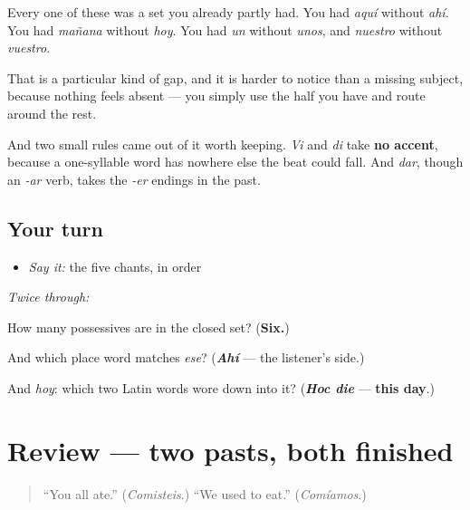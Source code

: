 \begin{grammarlens}[title={Grammar Lens: a gap in a set is hard to see}]
Every one of these was a set you already partly had. You had \emph{aquí} without \emph{ahí}. You had \emph{mañana} without \emph{hoy}. You had \emph{un} without \emph{unos}, and \emph{nuestro} without \emph{vuestro}.

That is a particular kind of gap, and it is harder to notice than a missing subject, because nothing feels absent — you simply use the half you have and route around the rest.

And two small rules came out of it worth keeping. \emph{Vi} and \emph{di} take \textbf{no accent}, because a one-syllable word has nowhere else the beat could fall. And \emph{dar}, though an \emph{-ar} verb, takes the \emph{-er} endings in the past.
\end{grammarlens}

\subsection*{Your turn}
\begin{itemize}
\raggedright
  \item \emph{Say it:} the five chants, in order
\end{itemize}

\emph{Twice through:}

\begin{tcolorbox}[breakable,colback=teal!4,colframe=teal!35!black,title={Before you move on}]
How many possessives are in the closed set? (\textbf{Six.})

And which place word matches \emph{ese}? (\emph{\textbf{Ahí}} — the listener's side.)

And \emph{hoy}: which two Latin words wore down into it? (\emph{\textbf{Hoc die}} — \textbf{this day}.)
\end{tcolorbox}
\section[(review)]{Review — two pasts, both finished}

\label{lesson:ES-C65-repaso-dos-pasados}



\begin{quote}
\textquotedblleft{}You all ate.\textquotedblright{} (\emph{Comisteis}.) \textquotedblleft{}We used to eat.\textquotedblright{} (\emph{Comíamos}.)
\end{quote}

